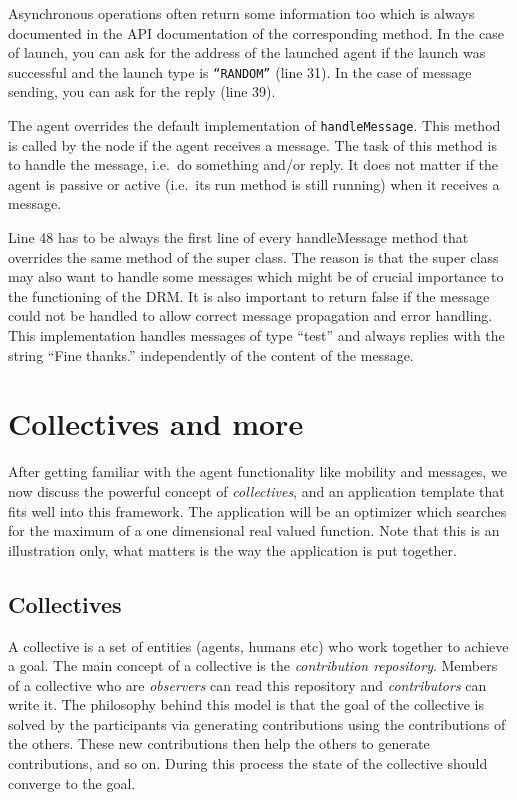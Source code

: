 \documentclass{article}
\begin{document}
Asynchronous operations often return some information too which is
always documented in the API documentation of the corresponding method.
In the case of launch, you can ask for the address of the launched agent
if the launch was successful and the launch type is {\tt ``RANDOM''}
(line 31).
In the case of message sending, you can ask for the reply (line 39).

The agent overrides the default implementation of {\tt handleMessage}.
This method is called by the node if the agent receives a message.
The task of this method is to handle the message, i.e.\ do something and/or
reply.
It does not matter if the agent is passive or active (i.e.\ its run method
is still running) when it receives a message.

Line 48 has to be always the first line of every handleMessage method
that overrides the same method of the super class.
The reason is that the super class may also want to handle some messages
which might be of crucial importance to the functioning of the DRM.
It is also important to return false if the message could not be handled
to allow correct message propagation and error handling.
This implementation handles messages of type ``test'' and always replies
with the string ``Fine thanks.'' independently of the content of the message.

\section{Collectives and more}
\label{sec:coll}

After getting familiar with the agent functionality like mobility and
messages, we now discuss the powerful concept of {\em collectives}, and
an application template that fits well into this framework.
The application will be an optimizer which searches for the maximum of
a one dimensional real valued function.
Note that this is an illustration only, what matters is the way the
application is put together.

\subsection{Collectives}

A collective is a set of entities (agents, humans etc) who work
together to achieve a goal.
The main concept of a collective is the {\em contribution repository}.
Members of a collective who are {\em observers} can read this repository
and {\em contributors} can write it.
The philosophy behind this model is that the goal of the collective is solved
by the participants via generating contributions using the contributions
of the others.
These new contributions then help the others to generate contributions, and
so on.
During this process the state of the collective should converge to the goal.
\end{document}
